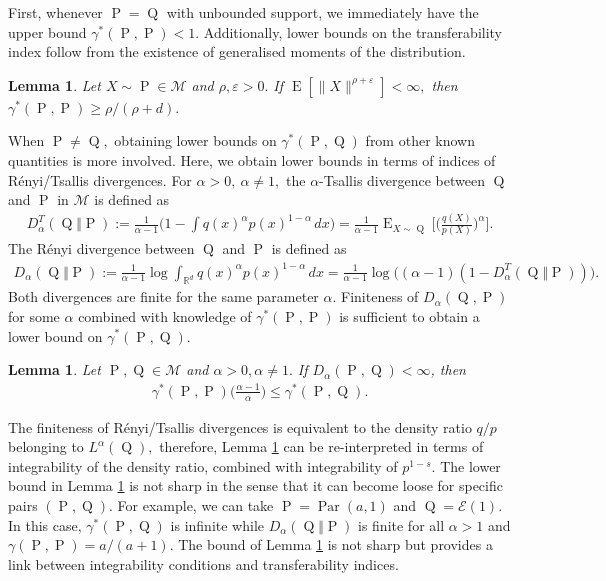 \documentclass[10pt]{article}
\newcommand{\eps}{\varepsilon}
\newcommand{\mE}{\mathcal{E}}
\newcommand{\mM}{\mathcal{M}}
\newcommand{\RR}{\mathbb{R}}
\newcommand{\E}{\operatorname{E}}
\renewcommand{\P}{\operatorname{P}}
\newcommand{\Q}{\operatorname{Q}}
\newcommand{\Par}{\operatorname{Par}}
\newtheorem{lemma}[theorem]{Lemma}
\begin{document}
First, whenever $\P = \Q$ with unbounded support, we immediately have the upper bound $\gamma^*(\P, \P) < 1.$ Additionally, lower bounds on the transferability index follow from the existence of generalised moments of the distribution.
\begin{lemma}
    \label{lem.moments.gamma}
    Let $X \sim \P \in \mM$ and $\rho, \eps > 0.$ If $\E[\| X \|^{\rho + \eps}] < \infty,$ then $\gamma^*(\P, \P) \geq \rho/(\rho + d).$
\end{lemma}
When $\P \neq \Q,$ obtaining lower bounds on $\gamma^*(\P, \Q)$ from other known quantities is more involved. Here, we obtain lower bounds in terms of indices of R\'enyi/Tsallis divergences. For $\alpha > 0, \ \alpha \neq 1,$ the $\alpha$-Tsallis divergence between $\Q$ and $\P$ in $\mM$ is defined as 
\begin{align*}
    D^T_{\alpha}(\Q\Vert \P) := \frac{1}{\alpha - 1}\Big(1 - \int q(x)^{\alpha}p(x)^{1- \alpha}\, dx\Big) = \frac{1}{\alpha - 1} \E_{X \sim \Q}\Big[\Big(\frac{q(X)}{p(X)}\Big)^\alpha\Big].
\end{align*}
The R\'enyi divergence between $\Q$ and $\P$ is defined as 
\begin{align*}
    D_{\alpha}(\Q\Vert \P) :=
        \frac{1}{\alpha - 1}\log \int_{\RR^d}q(x)^\alpha p(x)^{1 - \alpha}\, dx = \frac{1}{\alpha - 1}\log\big((\alpha - 1)(1 - D^T_{\alpha}(\Q\Vert \P))\big).
\end{align*}
Both divergences are finite for the same parameter $\alpha.$ Finiteness of $D_{\alpha}(\Q, \P)$ for some $\alpha$ combined with knowledge of $\gamma^*(\P, \P)$ is sufficient to obtain a lower bound on $\gamma^*(\P, \Q).$
\begin{lemma}
    \label{lem.renyi.to.gamma}
    Let $\P, \Q \in \mM$ and $\alpha > 0, \alpha \neq 1.$ If $D_\alpha(\P, \Q) < \infty$, then
    \begin{align*}
        \gamma^*(\P, \P)\Big(\frac{\alpha - 1}{\alpha}\Big) \leq \gamma^*(\P, \Q).
    \end{align*}
\end{lemma}
The finiteness of R\'enyi/Tsallis divergences is equivalent to the density ratio $q/p$ belonging to $L^\alpha(\Q),$ therefore, Lemma \ref{lem.renyi.to.gamma} can be re-interpreted in terms of integrability of the density ratio, combined with integrability of $p^{1-s}.$ The lower bound in Lemma \ref{lem.renyi.to.gamma} is not sharp in the sense that it can become loose for specific pairs $(\P, \Q).$ For example, we can take $\P = \Par(a, 1)$ and $\Q = \mE(1).$ In this case, $\gamma^*(\P, \Q)$ is infinite while $D_{\alpha}(\Q\Vert\P)$ is finite for all $\alpha > 1$ and $\gamma(\P, \P) = a/(a + 1).$ The bound of Lemma \ref{lem.renyi.to.gamma} is not sharp but provides a link between integrability conditions and transferability indices.\\
\end{document}
